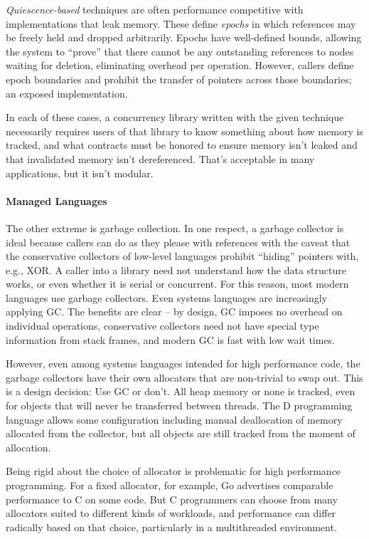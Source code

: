\textit{Quiescence-based} techniques\cite{FraserH07, Harris, Hart} are often performance competitive with implementations that leak memory.  These define \textit{epochs} in which references may be freely held and dropped arbitrarily.  Epochs have well-defined bounds, allowing the system to ``prove'' that there cannot be any outstanding references to nodes waiting for deletion, eliminating overhead per operation.  However, callers define epoch boundaries and prohibit the transfer of pointers across those boundaries; an exposed implementation.

In each of these cases, a concurrency library written with the given technique necessarily requires users of that library to know something about how memory is tracked, and what contracts must be honored to ensure memory isn't leaked and that invalidated memory isn't dereferenced.  That's acceptable in many applications, but it isn't modular.

\paragraph{Managed Languages} The other extreme is garbage collection.  In one respect, a garbage collector is ideal because callers can do as they please with references with the caveat that the conservative collectors of low-level languages prohibit ``hiding'' pointers with, e.g., XOR.  A caller into a library need not understand how the data structure works, or even whether it is serial or concurrent.  For this reason, most modern languages use garbage collectors.  Even systems languages are increasingly applying GC.  The benefits are clear -- by design, GC imposes no overhead on individual operations, conservative collectors need not have special type information from stack frames, and modern GC is fast with low wait times.\cite{ShahriyarBM14}

However, even among systems languages intended for high performance code, the garbage collectors have their own allocators that are non-trivial to swap out.\cite{Go, DotNetGC, D}  This is a design decision: Use GC or don't.  All heap memory or none is tracked, even for objects that will never be transferred between threads.  The D programming language allows some configuration including manual deallocation of memory allocated from the collector, but all objects are still tracked from the moment of allocation.\cite{DPhobos}

Being rigid about the choice of allocator is problematic for high performance programming.  For a fixed allocator, for example, Go advertises comparable performance to C on some code.  But C programmers can choose from many allocators suited to different kinds of workloads, and performance can differ radically based on that choice, particularly in a multithreaded environment.\cite{Hoard, TCMalloc, JEMalloc, Supermalloc}

